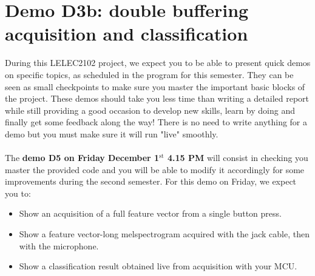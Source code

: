 \section{Demo D3b: double buffering acquisition and classification}
%
During this LELEC2102 project, we expect you to be able to present quick demos on specific topics, as scheduled in the program for this semester. They can be seen as small checkpoints to make sure you master the important basic blocks of the project. These demos should take you less time than writing a detailed report while still providing a good occasion to develop new skills, learn by doing and finally get some feedback along the way! There is no need to write anything for a demo but you must make sure it will run "live" smoothly. \\
\\
The \textbf{demo D5 on Friday December 1$^{\text{st}}$ 4.15 PM} will consist in checking you master the provided code and you will be able to modify it accordingly for some improvements during the second semester. For this demo on Friday, we expect you to:
%
\begin{itemize}
    \item Show an acquisition of a full feature vector from a single button press.
    \item Show a feature vector-long melspectrogram acquired with the jack cable, then with the microphone.
    \item Show a classification result obtained live from acquisition with your MCU.
\end{itemize}
